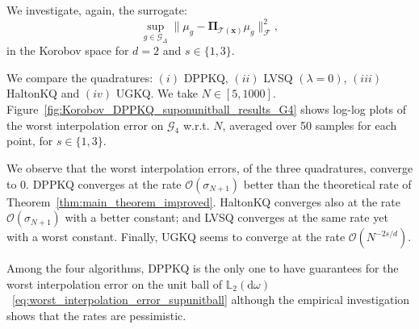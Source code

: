 \documentclass[twoside,11pt]{book}
\numberwithin{theorem}{chapter}
\numberwithin{definition}{chapter}
\numberwithin{proposition}{chapter}
\numberwithin{corollary}{chapter}
\numberwithin{example}{chapter}
\numberwithin{lemma}{chapter}
\numberwithin{assumption}{chapter}
\begin{document}

We investigate, again, the surrogate:
\begin{equation}\label{eq:surrogate_worst_inerpolation_error_2}
\sup\limits_{g \in \mathcal{G}_{\Delta} } \|\mu_{g}-\bm{\Pi}_{\mathcal{T}(\bm{x})} \mu_{g}\|_{\mathcal{F}}^{2},
\end{equation}
in the Korobov space for $d =2$ and $s \in \{1,3\}$.



We compare the quadratures: $(i)$ DPPKQ, $(ii)$ LVSQ $(\lambda = 0)$, $(iii)$ HaltonKQ and $(iv)$ UGKQ. We take $N \in [5,1000]$. Figure~\ref{fig:Korobov_DPPKQ_suponunitball_results_G4} shows log-log plots of the worst interpolation error on $\mathcal{G}_{4}$ w.r.t. $N$, averaged over 50 samples for each point, for $s \in \{1,3\}$. 

We observe that the worst interpolation errors, of the three quadratures, converge  to $0$. DPPKQ converges at the rate $\mathcal{O}(\sigma_{N+1})$ better than the theoretical rate of Theorem~\ref{thm:main_theorem_improved}. HaltonKQ converges also at the rate $\mathcal{O}(\sigma_{N+1})$ with a better constant; and LVSQ converges at the same rate yet with a worst constant. Finally, UGKQ seems to converge at the rate $\mathcal{O}(N^{-2s/d})$. 

Among the four algorithms, DPPKQ is the only one to have guarantees for the worst interpolation error on the unit ball of $\mathbb{L}_{2}(\mathrm{d}\omega)$~\eqref{eq:worst_interpolation_error_supunitball} although the empirical investigation shows that the rates are pessimistic.
\end{document}
